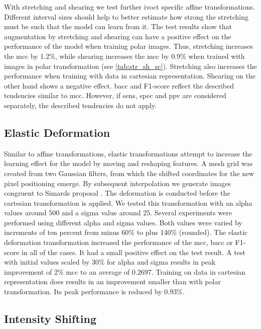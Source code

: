 With stretching and shearing we test further \acrshort{ivoct} specific affine transformations. Different interval sizes should help to better estimate how strong the stretching must be such that the model can learn from it. The test results show that augmentation by stretching and shearing can have a positive effect on the performance of the model when training polar images. Thus, stretching increases the \acrshort{mcc} by 1.2\%, while shearing increases the \acrshort{mcc} by 0.9\% when trained with images in polar transformation (see \cref{tab:str_sh_sc}). Stretching also increases the performance when training with data in cartesian representation. Shearing on the other hand shows a negative effect. \acrshort{bacc} and F1-score reflect the described tendencies similar to \acrshort{mcc}. However, if \acrshort{sens}, \acrshort{spec} and \acrshort{ppv} are considered separately, the described tendencies do not apply. 


\subsection{Elastic Deformation}

Similar to affine transformations, elastic transformations attempt to increase the learning effect for the model by moving and reshaping features. A mesh grid was created from two Gaussian filters, from which the shifted coordinates for the new pixel positioning emerge. By subsequent interpolation we generate images congruent to Simards proposal \cite{Simard.2003}. The deformation is conducted before the cartesian transformation is applied. We tested this transformation with an alpha values around 500 and a sigma value around 25. Several experiments were performed using different alpha and sigma values. Both values were varied by increments of ten percent from minus 60\% to plus 140\% (rounded). The elastic deformation transformation increased the performance of the \acrshort{mcc}, \acrshort{bacc} or F1-score in all of the cases. It had a small positive effect on the test result. A test with initial values scaled by 30\% for alpha and sigma results in peak improvement of 2\% \acrshort{mcc} to an average of 0.2697. Training on data in cartesian representation does results in an improvement smaller than with polar transformation. Its peak performance is reduced by 0.93\%.


\subsection{Intensity Shifting}

